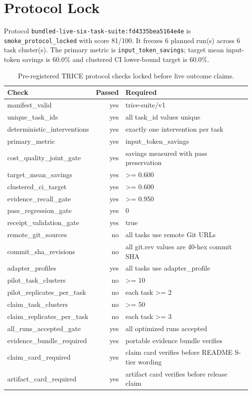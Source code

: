 \section{Protocol Lock}
Protocol \texttt{bundled-live-six-task-suite:fd4335bea5164e4e} is \texttt{smoke\_protocol\_locked} with score 81/100. It freezes 6 planned run(s) across 6 task cluster(s). The primary metric is \texttt{input\_token\_savings}; target mean input-token savings is 60.0\% and clustered CI lower-bound target is 60.0\%.

\begin{table}[h]
\centering
\begin{tabular}{lrl}
\toprule
Check & Passed & Required \\
\midrule
manifest\_valid & yes & trice-suite/v1 \\
unique\_task\_ids & yes & all task\_id values unique \\
deterministic\_interventions & yes & exactly one intervention per task \\
primary\_metric & yes & input\_token\_savings \\
cost\_quality\_joint\_gate & yes & savings measured with pass preservation \\
target\_mean\_savings & yes & >= 0.600 \\
clustered\_ci\_target & yes & >= 0.600 \\
evidence\_recall\_gate & yes & >= 0.950 \\
pass\_regression\_gate & yes & 0 \\
receipt\_validation\_gate & yes & true \\
remote\_git\_sources & no & all tasks use remote Git URLs \\
commit\_sha\_revisions & no & all git.rev values are 40-hex commit SHA \\
adapter\_profiles & yes & all tasks use adapter\_profile \\
pilot\_task\_clusters & no & >= 10 \\
pilot\_replicates\_per\_task & no & each task >= 2 \\
claim\_task\_clusters & no & >= 50 \\
claim\_replicates\_per\_task & no & each task >= 3 \\
all\_runs\_accepted\_gate & yes & all optimized runs accepted \\
evidence\_bundle\_required & yes & portable evidence bundle verifies \\
claim\_card\_required & yes & claim card verifies before README S-tier wording \\
artifact\_card\_required & yes & artifact card verifies before release claim \\
\bottomrule
\end{tabular}
\caption{Pre-registered TRICE protocol checks locked before live outcome claims.}
\end{table}

